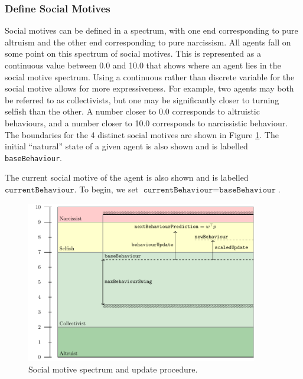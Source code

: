 \subsubsection{Define Social Motives}

Social motives can be defined in a spectrum, with one end corresponding to pure altruism and the other end corresponding to pure narcissism. All agents fall on some point on this spectrum of social motives. This is represented as a continuous value between 0.0 and 10.0 that shows where an agent lies in the social motive spectrum. Using a continuous rather than discrete variable for the social motive allows for more expressiveness. For example, two agents may both be referred to as collectivists, but one may be significantly closer to turning selfish than the other. A number closer to 0.0 corresponds to altruistic behaviours, and a number closer to 10.0 corresponds to narcissistic behaviour. The boundaries for the 4 distinct social motives are shown in Figure \ref{fig:socialMotives}. The initial “natural” state of a given agent is also shown and is labelled \texttt{baseBehaviour}. 

The current social motive of the agent is also shown and is labelled $\texttt{currentBehaviour}$. To begin, we set $\texttt{currentBehaviour} =\texttt{baseBehaviour}$.

\begin{figure}[htb]
    \centering
    \includegraphics[width=0.9\textwidth]{008_team_6_agent_design/SOMAS_social_motives.pdf}
    \caption{Social motive spectrum and update procedure. }
    \label{fig:socialMotives}
\end{figure}

